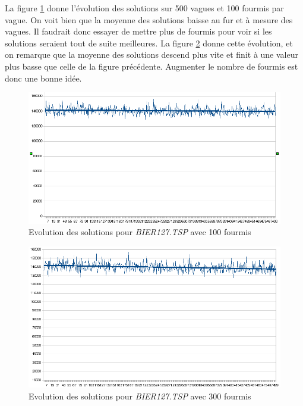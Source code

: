 \documentclass[a4paper, 11pt]{article}
\begin{document}
{	La figure \ref{fig:9} donne l'évolution des solutions sur 500 vagues et 100 fourmis par vague. On voit bien que la moyenne des solutions baisse au fur et à mesure des vagues. Il faudrait donc essayer de mettre plus de fourmis pour voir si les solutions seraient tout de suite meilleures. La figure \ref{fig:10} donne cette évolution, et on remarque que la moyenne des solutions descend plus vite et finit à une valeur plus basse que celle de la figure précédente. Augmenter le nombre de fourmis est donc une bonne idée. 

\begin{figure}[H]
   \begin{center}
      \includegraphics[width=14cm]{../images/9.png}
   \end{center}
   \caption{Evolution des solutions pour \textit{BIER127.TSP} avec 100 fourmis}
	\label{fig:9}
\end{figure}

\begin{figure}[H]
   \begin{center}
      \includegraphics[width=14cm]{../images/10.png}
   \end{center}
   \caption{Evolution des solutions pour \textit{BIER127.TSP} avec 300 fourmis}
	\label{fig:10}
\end{figure}

}
\end{document}
